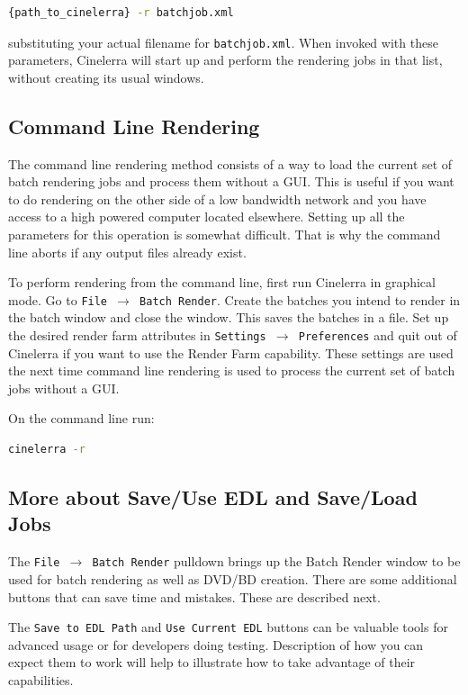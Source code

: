 \begin{lstlisting}[language=bash]
    {path_to_cinelerra} -r batchjob.xml
\end{lstlisting}
substituting  your actual filename for \texttt{batchjob.xml}.  When invoked with these parameters, Cinelerra will start up and perform the rendering jobs in that list, without creating its usual windows.

\subsection{Command Line Rendering}%
\label{sub:command_line_rendering}

The command line rendering method consists of a way to load the current set of batch rendering jobs and process them without a GUI. This is useful if you want to do rendering on the other side of a low bandwidth network and you have access to a high powered computer located elsewhere. Setting up all the parameters for this operation is somewhat difficult. That is why the command line aborts if any output files already exist.

To perform rendering from the command line, first run Cinelerra in graphical mode. Go to \texttt{File $\rightarrow$ Batch Render}. Create the batches you intend to render in the batch window and close the window. This saves the batches in a file. Set up the desired render farm attributes in \texttt{Settings $\rightarrow$ Preferences} and quit out of Cinelerra if you want to use the Render Farm capability.  These settings are used the next time command line rendering is used to process the current set of batch jobs without a GUI.

On the command line run:

\begin{lstlisting}[language=bash]
cinelerra -r
\end{lstlisting}

\subsection{More about Save/Use EDL and Save/Load Jobs}%
\label{sub:more_save_use_edl_jobs}

The \texttt{File $\rightarrow$ Batch Render} pulldown brings up the Batch Render window to be used for batch rendering as well as DVD/BD creation.  There are some additional buttons that can save time and mistakes.  These are described next.

The \texttt{Save to EDL Path} and \texttt{Use Current EDL} buttons can be valuable tools for advanced usage or for developers doing testing.  Description of how you can expect them to work will help to illustrate how to take advantage of their capabilities.

